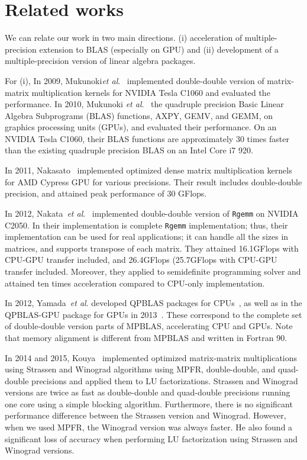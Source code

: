 \documentclass[12pt]{article}
\newcommand{\etal}{\textit{et al}.}
\begin{document}
\section{Related works}
\label{sec:relatedworks}
We can relate our work in two main directions. (i) acceleration of multiple-precision extension to BLAS (especially on GPU) and (ii) development of a multiple-precision version of linear algebra packages.

For (i), In 2009, Mukunoki\etal{}~\cite{HPC-137_1} implemented double-double version of matrix-matrix multiplication kernels for NVIDIA Tesla C1060 and evaluated the performance. In 2010, Mukunoki \etal{}~\cite{10.1007/978-3-642-28151-8_25} the quadruple precision Basic Linear Algebra Subprograms (BLAS) functions, AXPY, GEMV, and GEMM, on graphics processing units (GPUs), and evaluated their performance. On an NVIDIA Tesla C1060, their BLAS functions are approximately 30 times faster than the existing quadruple precision BLAS on an Intel Core i7 920.

In 2011, Nakasato~\cite{Nakasato2011AFG} implemented optimized dense matrix multiplication kernels for AMD Cypress GPU for various precisions. Their result includes double-double precision, and attained peak performance of 30 GFlops.

In 2012, Nakata~\etal{}~\cite{6495966} implemented double-double version of {\tt Rgemm} on NVIDIA C2050. In their implementation is complete {\tt Rgemm} implementation; thus, their implementation can be used for real applications; it can handle all the sizes in matrices, and supports transpose of each matrix. They attained 16.1GFlops with CPU-GPU transfer included, and 26.4GFlops (25.7GFlops with CPU-GPU transfer included. Moreover, they applied to semidefinite programming solver and attained ten times acceleration compared to CPU-only implementation.

In 2012, Yamada~\etal{} developed QPBLAS packages for CPUs~\cite{7965202}, as well as in the QPBLAS-GPU package for GPUs in 2013~\cite{qpblas-gpu}. These correspond to the complete set of double-double version parts of MPBLAS, accelerating CPU and GPUs. Note that memory alignment is different from MPBLAS and written in Fortran 90.

In 2014 and 2015, Kouya~\cite{Tomonori_Kouya2014,Tomonori_Kouya2016} implemented optimized  matrix-matrix multiplications using Strassen and Winograd algorithms using MPFR, double-double, and quad-double precisions and applied them to LU factorizations. Strassen and Winograd versions are twice as fast as double-double and quad-double precisions running one core using a simple blocking algorithm. Furthermore, there is no significant performance difference between the Strassen version and Winograd. However, when we used MPFR, the Winograd version was always faster. He also found a significant loss of accuracy when performing LU factorization using Strassen and Winograd versions. 
\end{document}

